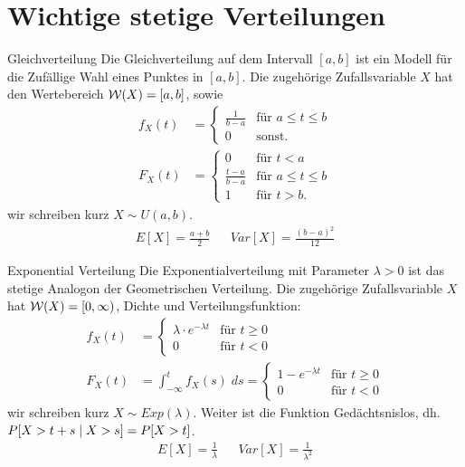 \section{Wichtige stetige Verteilungen}
\begin{definition}{Gleichverteilung}
  Die Gleichverteilung auf dem Intervall $[a, b]$ ist ein Modell für die
  Zufällige Wahl eines Punktes in $[a, b]$. Die zugehörige Zufallsvariable $X$
  hat den Wertebereich $\mathcal{W} (X) = [a, b]$, sowie
  \begin{align*}
    f_X (t) & =
    \begin{cases}
      \frac{1}{b-a} & \text{für } a \leq t \leq b \\
      0             & \text{sonst.}
    \end{cases} \\
    F_X (t) & =
    \begin{cases}
      0               & \text{für } t < a           \\
      \frac{t-a}{b-a} & \text{für } a \leq t \leq b \\
      1               & \text{für } t > b.
    \end{cases}
  \end{align*}
  wir schreiben kurz $X \sim U (a, b)$.
  \begin{align*}
    E[X] = \frac{a + b}{2} &  & Var[X] = \frac{{(b - a)}^2}{12}
  \end{align*}
\end{definition}
\begin{definition}{Exponential Verteilung}
  Die Exponentialverteilung mit Parameter $\lambda > 0$ ist das stetige Analogon
  der Geometrischen Verteilung. Die zugehörige Zufallsvariable $X$ hat $\mathcal{W} (X) =
    [0, \infty)$, Dichte und Verteilungsfunktion:
  \begin{align*}
    f_X (t) & =
    \begin{cases}
      \lambda \cdot e^{-\lambda t} & \text{für } t \geq 0 \\
      0                            & \text{für }t < 0
    \end{cases} \\
    F_X (t) & =
    \int_{-\infty}^t f_X (s) \; ds =
    \begin{cases}
      1 - e^{-\lambda t} & \text{für } t \geq 0 \\
      0                  & \text{für }t < 0
    \end{cases}
  \end{align*}
  wir schreiben kurz $X \sim Exp (\lambda)$. Weiter ist
  die Funktion Gedächtsnislos, dh. $P[X > t + s \; | \; X > s] = P[X > t]$.
  \begin{align*}
    E[X] = \frac{1}{\lambda} &  & Var[X] = \frac{1}{\lambda^2}
  \end{align*}
\end{definition}

